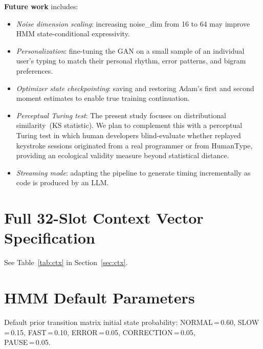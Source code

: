\documentclass[sigconf,nonacm]{acmart}
\begin{document}
\textbf{Future work} includes:
\begin{itemize}
  \item \textit{Noise dimension scaling}: increasing noise\_dim from 16 to 64 may improve
    HMM state-conditional expressivity.
  \item \textit{Personalization}: fine-tuning the GAN on a small sample of an individual
    user's typing to match their personal rhythm, error patterns, and bigram preferences.
  \item \textit{Optimizer state checkpointing}: saving and restoring Adam's first and second
    moment estimates to enable true training continuation.
  \item \textit{Perceptual Turing test}: The present study focuses on distributional
    similarity~(KS statistic). We plan to complement this with a perceptual Turing test
    in which human developers blind-evaluate whether replayed keystroke sessions
    originated from a real programmer or from HumanType, providing an ecological
    validity measure beyond statistical distance.
  \item \textit{Streaming mode}: adapting the pipeline to generate timing incrementally
    as code is produced by an LLM.
\end{itemize}




\appendix

\section{Full 32-Slot Context Vector Specification}
\label{app:ctx}

See Table~\ref{tab:ctx} in Section~\ref{sec:ctx}.

\section{HMM Default Parameters}

Default prior transition matrix initial state probability:
NORMAL\,=\,0.60, SLOW\,=\,0.15, FAST\,=\,0.10, ERROR\,=\,0.05,
CORRECTION\,=\,0.05,\\ PAUSE\,=\,0.05.
\end{document}
